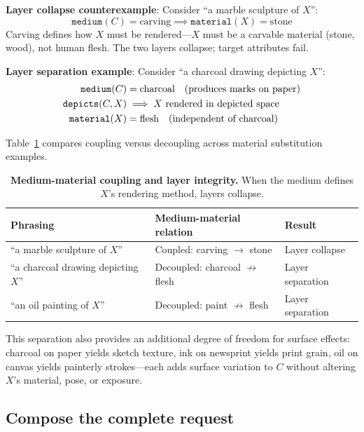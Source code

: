 \textbf{Layer collapse counterexample}: Consider ``a marble sculpture of $X$'':
\begin{equation}
\texttt{medium}(C) = \text{carving} \implies \texttt{material}(X) = \text{stone}
\label{eq:collapse}
\end{equation}
Carving defines how $X$ must be rendered—$X$ must be a carvable material (stone, wood), not human flesh. The two layers collapse; target attributes fail.

\textbf{Layer separation example}: Consider ``a charcoal drawing depicting $X$'':
\begin{align}
\texttt{medium}(C) &= \text{charcoal} \quad \text{(produces marks on paper)} \notag \\
\texttt{depicts}(C, X) &\implies X \text{ rendered in depicted space} \notag \\
\texttt{material}(X) &= \text{flesh} \quad \text{(independent of charcoal)} \label{eq:separation}
\end{align}

Table~\ref{tab:mediumcoupling} compares coupling versus decoupling across material substitution examples.

\begin{table}[t]
\centering\small
\begin{tabular}{@{}p{}ll@{}}
\toprule
Phrasing & Medium-material relation & Result \\
\midrule
``a marble sculpture of $X$'' & Coupled: carving $\to$ stone & Layer collapse \\
``a charcoal drawing depicting $X$'' & Decoupled: charcoal $\not\to$ flesh & Layer separation \\
``an oil painting of $X$'' & Decoupled: paint $\not\to$ flesh & Layer separation \\
\bottomrule
\end{tabular}
\caption{\textbf{Medium-material coupling and layer integrity.} When the medium defines $X$'s rendering method, layers collapse.}
\label{tab:mediumcoupling}
\end{table}

This separation also provides an additional degree of freedom for surface effects: charcoal on paper yields sketch texture, ink on newsprint yields print grain, oil on canvas yields painterly strokes—each adds surface variation to $C$ without altering $X$'s material, pose, or exposure.

\subsection{Compose the complete request}

